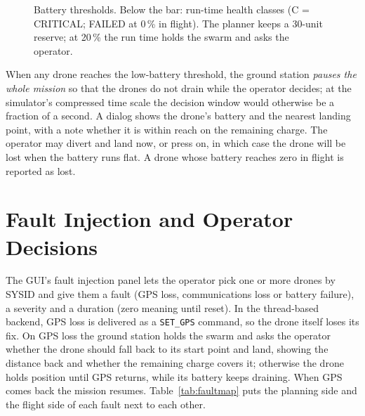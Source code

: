 \documentclass[11pt,a4paper,oneside]{report}
\newcommand{\code}[1]{\texttt{#1}}
\begin{document}
\begin{figure}[H]
\centering
{}
\caption[Battery thresholds at planning time and run time]{Battery thresholds. Below the bar:
run-time health classes (C = CRITICAL; FAILED at 0\,\% in flight). The planner keeps a 30-unit
reserve; at 20\,\% the run time holds the swarm and asks the operator.}
\label{fig:battery}
\end{figure}

\noindent When any drone reaches the low-battery threshold, the ground station \emph{pauses the
whole mission} so that the drones do not drain while the operator decides; at the simulator's
compressed time scale the decision window would otherwise be a fraction of a second. A dialog
shows the drone's battery and the nearest landing point, with a note whether it is within reach
on the remaining charge. The operator may divert and land now, or press on, in which case the
drone will be lost when the battery runs flat. A drone whose battery reaches zero in flight is
reported as lost.

\section{Fault Injection and Operator Decisions}
The GUI's fault injection panel lets the operator pick one or more drones by SYSID and give them
a fault (GPS loss, communications loss or battery failure), a severity and a duration (zero
meaning until reset). In the thread-based backend, GPS loss is delivered as a \code{SET\_GPS}
command, so the drone itself loses its fix. On GPS loss the ground station holds the swarm and
asks the operator whether the drone should fall back to its start point and land, showing the
distance back and whether the remaining charge covers it; otherwise the drone holds position
until GPS returns, while its battery keeps draining. When GPS comes back the mission resumes.
Table~\ref{tab:faultmap} puts the planning side and the flight side of each fault next to each
other.
\end{document}
